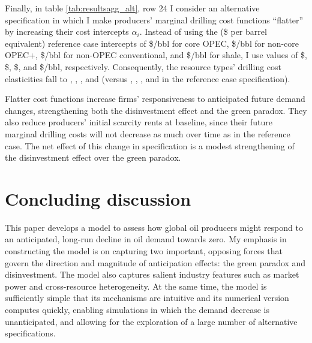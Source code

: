 \documentclass[12pt]{article}
\begin{document}
Finally, in table \ref{tab:resultsagg_alt}, row 24 I consider an alternative specification in which I make producers' marginal drilling cost functions ``flatter'' by increasing their cost intercepts $\alpha_i$. Instead of using the (\$ per barrel equivalent) reference case intercepts of \$\unskip/bbl for core OPEC, \$\unskip/bbl for non-core OPEC+, \$\unskip/bbl for non-OPEC conventional, and \$\unskip/bbl for shale, I use values of \$\unskip, \$\unskip, \$\unskip, and \$\unskip/bbl, respectively. Consequently, the resource types' drilling cost elasticities fall to \unskip, \unskip, \unskip, and (versus \unskip, \unskip, \unskip, and in the reference case specification).

Flatter cost functions increase firms' responsiveness to anticipated future demand changes, strengthening both the disinvestment effect and the green paradox. They also reduce producers' initial scarcity rents at baseline, since their future marginal drilling costs will not decrease as much over time as in the reference case. The net effect of this change in specification is a modest strengthening of the disinvestment effect over the green paradox.



\section{Concluding discussion} \label{sec:conclude}

This paper develops a model to assess how global oil producers might respond to an anticipated, long-run decline in oil demand towards zero. My emphasis in constructing the model is on capturing two important, opposing forces that govern the direction and magnitude of anticipation effects: the green paradox and disinvestment. The model also captures salient industry features such as market power and cross-resource heterogeneity. At the same time, the model is sufficiently simple that its mechanisms are intuitive and its numerical version computes quickly, enabling simulations in which the demand decrease is unanticipated, and allowing for the exploration of a large number of alternative specifications.
\end{document}
